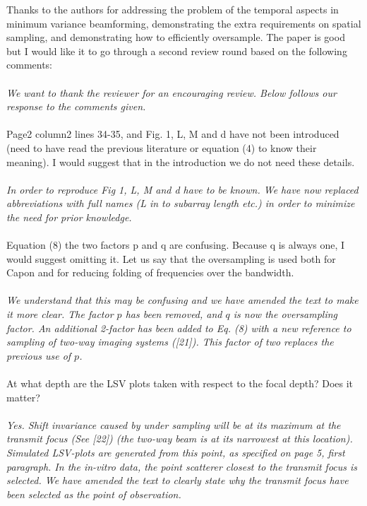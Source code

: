 \documentclass{article}
\begin{document}
Thanks to the authors for addressing the problem of the temporal aspects in minimum variance beamforming, demonstrating the extra requirements on spatial sampling, and demonstrating how to efficiently oversample. The paper is good but I would like it to go through a second review round based on the following comments:
\\\\
\textit{We want to thank the reviewer for an encouraging review. Below follows our response to the comments given.}
\\\\
Page2 column2 lines 34-35, and Fig. 1, L, M and d have not been introduced (need to have read the previous literature or equation (4) to know their meaning). I would suggest that in the introduction we do not need these details.
\\\\
\textit{In order to reproduce Fig 1, L, M and d have to be known. We have now replaced abbreviations with full names (L in to subarray length etc.) in order to minimize the need for prior knowledge.}
\\\\
Equation (8) the two factors p and q are confusing. Because q is always one, I would suggest omitting it.  Let us say that the oversampling is used both for Capon and for reducing folding of frequencies over the bandwidth.
\\\\
\textit{We understand that this may be confusing and we have amended the text to make it more clear. The factor $p$ has been removed, and $q$ is now the oversampling factor. An additional 2-factor has been added to Eq. (8) with a new reference to sampling of two-way imaging systems ([21]). This factor of two replaces the previous use of $p$.}
\\\\
At what depth are the LSV plots taken with respect to the focal depth? Does it matter?
\\\\
\textit{Yes. Shift invariance caused by under sampling will be at its maximum at the transmit focus (See [22]) (the two-way beam is at its narrowest at this location). Simulated LSV-plots are generated from this point, as specified on page 5, first paragraph. In the in-vitro data, the point scatterer closest to the transmit focus is selected. We have amended the text to clearly state why the transmit focus have been selected as the point of observation.}
\\\\
\end{document}
